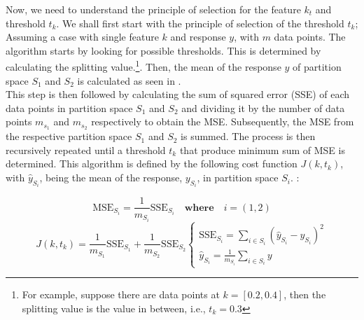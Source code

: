 Now, we need to understand the principle of selection for the feature $k_t$ and threshold $t_k$. We shall first start with the principle of selection of the threshold $t_k$; Assuming a case with single feature $k$ and response $y$, with $m$ data points. The algorithm starts by looking for possible thresholds. This is determined by calculating the splitting value.\footnote{For example, suppose there are data points at $k = [0.2,0.4]$, then the splitting value is the value in between, i.e., $t_k = 0.3$}. Then, the mean of the response $y$ of partition space $S_1$ and $S_2$ is calculated as seen in .\\ 

This step is then followed by calculating the sum of squared error (SSE) of each data points in partition space $S_1$ and $S_2$ and dividing it by the number of data points $m_{s_1}$ and $m_{s_2}$ respectively to obtain the MSE. Subsequently, the MSE from the respective partition space $S_1$ and $S_2$ is summed. The process is then recursively repeated until a threshold $t_k$ that produce minimum sum of MSE is determined. This algorithm is defined by the following cost function $J(k,t_k)$, with $\hat{y}_{S_i}$, being the mean of the response, $y_{S_i}$, in partition space $S_i$. \citep{Geron.2019,Kuhn.2013}:

\begin{equation}\label{eqn:sse}
    \text{MSE}_{S_i} = \frac{1}{m_{S_i}}\text{SSE}_{S_i} \quad \textbf{where} \quad i = (1,2)   
\end{equation}
\begin{equation}\label{eqn:costfun}
    J(k,t_k) = \frac{1}{m_{S_1}}\text{SSE}_{S_1} + \frac{1}{m_{S_2}}\text{SSE}_{S_2}
    \begin{cases}
        \text{SSE}_{S_i} = \sum\limits_{i \in S_i}(\hat{y}_{S_i} - y_{S_i} )^2 \\
        \hat{y}_{S_i} = \frac{1}{m_{S_i}}\sum\limits_{i\in S_i} y
    \end{cases}  
\end{equation}


